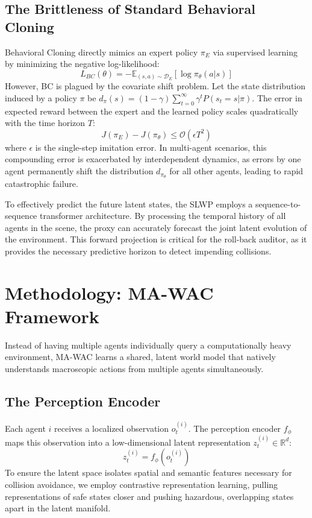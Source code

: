 \documentclass[conference]{IEEEtran}
\begin{document}
\subsection{The Brittleness of Standard Behavioral Cloning}
Behavioral Cloning directly mimics an expert policy $\pi_E$ via supervised learning by minimizing the negative log-likelihood:
\begin{equation}
L_{BC}(\theta) = -\mathbb{E}_{(s,a) \sim \mathcal{D}_E} \left[ \log \pi_\theta(a|s) \right]
\end{equation}
However, BC is plagued by the covariate shift problem. Let the state distribution induced by a policy $\pi$ be $d_\pi(s) = (1-\gamma) \sum_{t=0}^\infty \gamma^t P(s_t = s | \pi)$. The error in expected reward between the expert and the learned policy scales quadratically with the time horizon $T$:
\begin{equation}
J(\pi_E) - J(\pi_\theta) \leq \mathcal{O}(\epsilon T^2)
\end{equation}
where $\epsilon$ is the single-step imitation error. In multi-agent scenarios, this compounding error is exacerbated by interdependent dynamics, as errors by one agent permanently shift the distribution $d_{\pi_\theta}$ for all other agents, leading to rapid catastrophic failure.

To effectively predict the future latent states, the SLWP employs a sequence-to-sequence transformer architecture. By processing the temporal history of all agents in the scene, the proxy can accurately forecast the joint latent evolution of the environment. This forward projection is critical for the roll-back auditor, as it provides the necessary predictive horizon to detect impending collisions.

\section{Methodology: MA-WAC Framework}\label{sec3_method}
Instead of having multiple agents individually query a computationally heavy environment, MA-WAC learns a shared, latent world model that natively understands macroscopic actions from multiple agents simultaneously. 

\subsection{The Perception Encoder}
Each agent $i$ receives a localized observation $o_t^{(i)}$. The perception encoder $f_\phi$ maps this observation into a low-dimensional latent representation $z_t^{(i)} \in \mathbb{R}^d$:
\begin{equation}
z_t^{(i)} = f_\phi(o_t^{(i)})
\end{equation}
To ensure the latent space isolates spatial and semantic features necessary for collision avoidance, we employ contrastive representation learning, pulling representations of safe states closer and pushing hazardous, overlapping states apart in the latent manifold.
\end{document}
